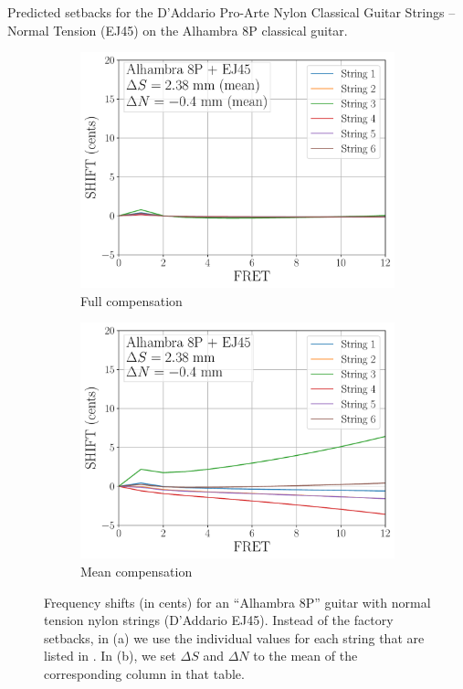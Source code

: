  \begin{table}[htbp]
  \centering
  \caption{\label{tbl:ej45_setbacks} Predicted setbacks for the D'Addario Pro-Arte Nylon Classical Guitar Strings -- Normal Tension (EJ45) on the Alhambra 8P classical guitar.}
  
 \end{table}%

 \begin{figure}
  \centering
  \begin{subfigure}[b]{0.8\textwidth}
   \centering
   \includegraphics[width=5.0in]{figures/shift_alhambra8p_ej45_full}
   \caption{Full compensation}
   \label{fig:shift_alhambra8p_ej45_full}
  \end{subfigure}
  \par\vspace{0.25in}
  \begin{subfigure}[b]{0.8\textwidth}
   \centering
   \includegraphics[width=5.0in]{figures/shift_alhambra8p_ej45_mean}
   \caption{Mean compensation}
   \label{fig:shift_alhambra8p_ej45_mean}
  \end{subfigure}
  \caption{\label{fig:compensation_alhambra8p_ej45} Frequency shifts (in cents) for an ``Alhambra 8P'' guitar with normal tension nylon strings (D'Addario EJ45). Instead of the factory setbacks, in (a) we use the individual values for each string that are listed in . In (b), we set $\Delta S$ and $\Delta N$ to the mean of the corresponding column in that table.}
 \end{figure}

